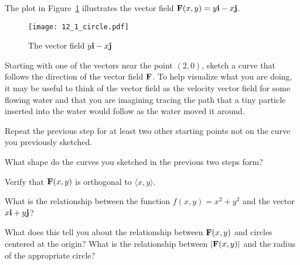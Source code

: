 \begin{activity} \label{A:12.1.1}  
\nin The plot in Figure~\ref{fig:12.1.circle} illustrates the vector
field $\mathbf{F}(x,y) = y\mathbf{i} -x\mathbf{j}$.
\begin{figure}[h]
  \centering
  \texttt{[image: 12\_1\_circle.pdf]}
  \caption{The vector field $y\mathbf{i}-x\mathbf{j}$}
  \label{fig:12.1.circle}
\end{figure}
\ba
\item Starting with one of the vectors near the point $(2,0)$, sketch
  a curve that follows the direction of the vector field $\mathbf{F}$. To
  help visualize what you are doing, it may be useful to think of the
  vector field as the velocity vector field for some flowing water and
  that you are imagining tracing the path that a tiny particle
  inserted into the water would follow as the water moved it around.
\item Repeat the previous step for at least two other starting points
  not on the curve you previously sketched.
\item What shape do the curves you sketched in the previous two steps
  form?
\item Verify that $\mathbf{F}(x,y)$ is orthogonal to $\langle x,y\rangle$.
\item What is the relationship between the function $f(x,y) = x^2 +
  y^2$ and the vector $x\mathbf{i} + y\mathbf{j}$? %
\item What does this tell you about the relationship between
  $\mathbf{F}(x,y)$ and circles centered at the origin?  What is the
  relationship between $|\mathbf{F}(x,y)|$ and the radius of the appropriate circle?
\ea
\end{activity}
\begin{smallhint}

\end{smallhint}
\begin{bighint}

\end{bighint}
\begin{activitySolution}

\end{activitySolution}
\aftera
